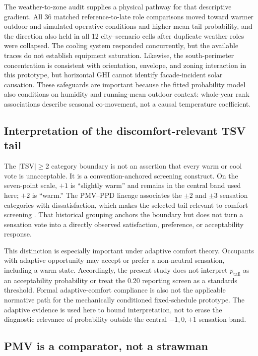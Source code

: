 The weather-to-zone audit supplies a physical pathway for that descriptive gradient. All 36 matched reference-to-late role comparisons moved toward warmer outdoor and simulated operative conditions and higher mean tail probability, and the direction also held in all 12 city--scenario cells after duplicate weather roles were collapsed. The cooling system responded concurrently, but the available traces do not establish equipment saturation. Likewise, the south-perimeter concentration is consistent with orientation, envelope, and zoning interaction in this prototype, but horizontal GHI cannot identify facade-incident solar causation. These safeguards are important because the fitted probability model also conditions on humidity and running-mean outdoor context: whole-year rank associations describe seasonal co-movement, not a causal temperature coefficient.

\subsection{Interpretation of the discomfort-relevant TSV tail}

The \(|\mathrm{TSV}|\ge2\) category boundary is not an assertion that every warm or cool vote is unacceptable. It is a convention-anchored screening construct. On the seven-point scale, \(+1\) is ``slightly warm'' and remains in the central band used here; \(+2\) is ``warm.'' The PMV--PPD lineage associates the \(\pm2\) and \(\pm3\) sensation categories with dissatisfaction, which makes the selected tail relevant to comfort screening \citep{Fanger1970PMV,ASHRAE2023}. That historical grouping anchors the boundary but does not turn a sensation vote into a directly observed satisfaction, preference, or acceptability response.

This distinction is especially important under adaptive comfort theory. Occupants with adaptive opportunity may accept or prefer a non-neutral sensation, including a warm state. Accordingly, the present study does not interpret \(p_{\mathrm{tail}}\) as an acceptability probability or treat the 0.20 reporting screen as a standards threshold. Formal adaptive-comfort compliance is also not the applicable normative path for the mechanically conditioned fixed-schedule prototype. The adaptive evidence is used here to bound interpretation, not to erase the diagnostic relevance of probability outside the central \(-1,0,+1\) sensation band.

\subsection{PMV is a comparator, not a strawman}

